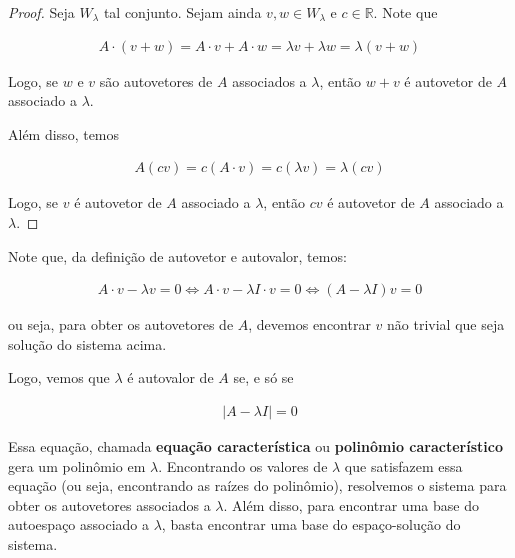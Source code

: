 \documentclass{article}
\begin{document}
\begin{proof}
	Seja $W_{\lambda}$ tal conjunto. Sejam ainda $v,w \in W_{\lambda}$ e $c\in\mathbb{R}$. Note que
	
	\begin{align*}
	A\cdot(v+w) = A\cdot v + A\cdot w = \lambda v + \lambda w = \lambda(v+w)
	\end{align*}
	
	\par\vspace{0.3cm} Logo, se $w$ e $v$ são autovetores de $A$ associados a $\lambda$, então $w+v$ é autovetor de $A$ associado a $\lambda$.
	
	\par\vspace{0.3cm} Além disso, temos
	
	\begin{align*}
	A(cv) = c(A\cdot v) = c(\lambda v) = \lambda(cv)
	\end{align*}
	
	\par\vspace{0.3cm} Logo, se $v$ é autovetor de $A$ associado a $\lambda$, então $cv$ é autovetor de $A$ associado a $\lambda$.
	
\end{proof}

\par\vspace{0.3cm} Note que, da definição de autovetor e autovalor, temos:

\begin{align*}
A\cdot v - \lambda v = 0 \Leftrightarrow A\cdot v - \lambda I\cdot v = 0 \Leftrightarrow (A - \lambda I)v = 0 
\end{align*}

\par\vspace{0.3cm} ou seja, para obter os autovetores de $A$, devemos encontrar $v$ não trivial que seja solução do sistema acima.

\par\vspace{0.3cm} Logo, vemos que $\lambda$ é autovalor de $A$ se, e só se

\begin{align*}
|A - \lambda I| = 0 
\end{align*} 

\par\vspace{0.3cm} Essa equação, chamada \textbf{equação característica} ou \textbf{polinômio característico} gera um polinômio em $\lambda$. Encontrando os valores de $\lambda$ que satisfazem essa equação (ou seja, encontrando as raízes do polinômio), resolvemos o sistema para obter os autovetores associados a $\lambda$. Além disso, para encontrar uma base do autoespaço associado a $\lambda$, basta encontrar uma base do espaço-solução do sistema.
\end{document}
